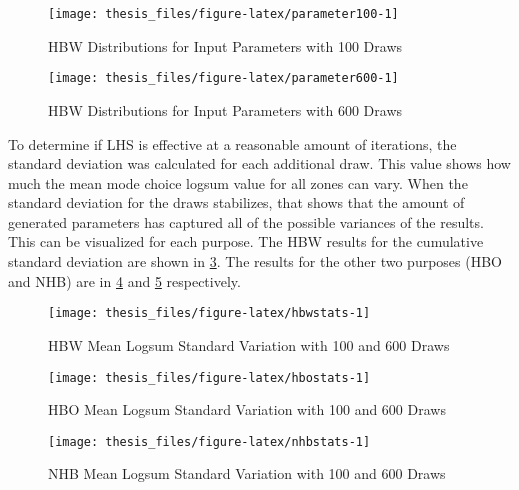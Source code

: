 \documentclass[fancy, masters,twoside]{byuthesis}
\begin{document}
\begin{figure}

{\centering \texttt{[image: thesis\_files/figure-latex/parameter100-1]} 

}

\caption{HBW Distributions for Input Parameters with 100 Draws}\label{fig:parameter100}
\end{figure}

\begin{figure}

{\centering \texttt{[image: thesis\_files/figure-latex/parameter600-1]} 

}

\caption{HBW Distributions for Input Parameters with 600 Draws}\label{fig:parameter600}
\end{figure}

To determine if LHS is effective at a reasonable amount of iterations, the standard deviation was calculated for each additional draw. This value shows how much the mean mode choice logsum value for all zones can vary. When the standard deviation for the draws stabilizes, that shows that the amount of generated parameters has captured all of the possible variances of the results. This can be visualized for each purpose. The HBW results for the cumulative standard deviation are shown in \ref{fig:hbwstats}. The results for the other two purposes (HBO and NHB) are in \ref{fig:hbostats} and \ref{fig:nhbstats} respectively.

\begin{figure}

{\centering \texttt{[image: thesis\_files/figure-latex/hbwstats-1]} 

}

\caption{HBW Mean Logsum Standard Variation with 100 and 600 Draws}\label{fig:hbwstats}
\end{figure}

\begin{figure}

{\centering \texttt{[image: thesis\_files/figure-latex/hbostats-1]} 

}

\caption{HBO Mean Logsum Standard Variation with 100 and 600 Draws}\label{fig:hbostats}
\end{figure}

\begin{figure}

{\centering \texttt{[image: thesis\_files/figure-latex/nhbstats-1]} 

}

\caption{NHB Mean Logsum Standard Variation with 100 and 600 Draws}\label{fig:nhbstats}
\end{figure}
\end{document}
